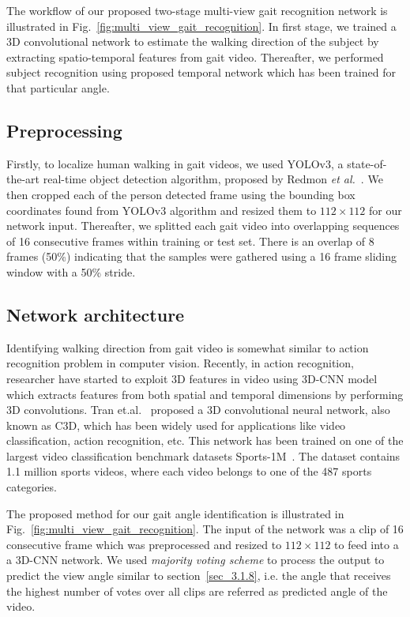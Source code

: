 The workflow of our proposed two-stage multi-view gait recognition network is illustrated in Fig.~\ref{fig:multi_view_gait_recognition}. In first stage, we trained a 3D convolutional network to estimate the walking direction of the subject by extracting spatio-temporal features from gait video. Thereafter, we performed subject recognition using proposed temporal network which has been trained for that particular angle.

\subsection{Preprocessing}
Firstly, to localize human walking in gait videos, we used YOLOv3, a state-of-the-art real-time object detection algorithm, proposed by Redmon \textit{et al.}~\cite{Redmon_18}. We then cropped each of the person detected frame using the bounding box coordinates found from YOLOv3 algorithm and resized them to $112\times112$ for our network input. Thereafter, we splitted each gait video into overlapping sequences of 16 consecutive frames within training or test set. There is an overlap of 8 frames (50\%) indicating that the samples were gathered using a 16 frame sliding window with a 50\% stride.


\subsection{Network architecture}
Identifying walking direction from gait video is somewhat similar to action recognition problem in computer vision. Recently, in action recognition, researcher have started to exploit 3D features in video using 3D-CNN model which extracts features from both spatial and temporal dimensions by performing 3D convolutions. Tran et.al.~\cite{Tran_15} proposed a 3D convolutional neural network, also known as C3D, which has been widely used for applications like video classification, action recognition, etc. This network has been trained on one of the largest video classification benchmark datasets Sports-1M~\cite{Karpathy_14}. The dataset contains 1.1 million sports videos, where each video belongs to one of the 487 sports categories. 

The proposed method for our gait angle identification is illustrated in Fig.~\ref{fig:multi_view_gait_recognition}. The input of the network was a clip of 16 consecutive frame which was preprocessed and resized to $112\times112$ to feed into a a 3D-CNN network. We used {\textit {majority voting scheme}} to process the output to predict the view angle similar to section~\ref{sec_3.1.8}, i.e. the angle that receives the highest number of votes over all clips are referred as predicted angle of the video.

